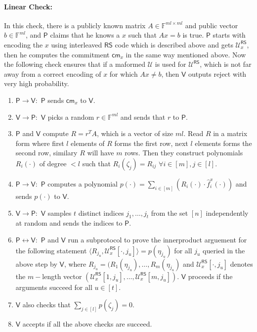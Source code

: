 \documentclass[runningheads]{llncs}
\newcommand{\innp}[2]{\langle #1,#2\rangle}
\def\prover{\mathsf{P}}
\def\verifier{\mathsf{V}}
\def\RS{\mathsf{RS}} %
\def\cm{\mathsf{cm}} %
\def\calU{\mathcal{U}}
\def\bbF{\mathbb{F}}
\begin{document}
	\paragraph{\textbf{Linear Check:}} In this check, there is a publicly known matrix $A \in \bbF^{ml\times ml}$ and public vector $b\in \bbF^{ml}$, and $\prover$ claims that he knows a $x$ such that $Ax=b$ is true. $\prover$ starts with encoding the $x$ using interleaved $\RS$ code which is described above and gets $\calU^{\RS}_x$, then he computes the commitment $\cm_x$ in the same way mentioned above. Now the following check ensures that if a maformed $\calU$ is used for $\calU^{\RS}$, which is not far away from a correct encoding of $x$ for which $Ax\neq b$, then $\verifier$ outputs reject with very high probability.
	\begin{enumerate}
		\item $\prover \rightarrow \verifier: $ $\prover$ sends $\cm_x$ to $\verifier$.
		\item $\verifier \rightarrow \prover: $ $\verifier$ picks a random $r\in \bbF^{ml}$ and sends that $r$ to $\prover$.
		\item $\prover$ and $\verifier$ compute $R=r^TA$, which is a vector of size $ml$. Read $R$ in a matrix form where first $l$ elements of $R$ forms the first row, next $l$ elements forms the second row, similary $R$ will have $m$ rows. Then they construct polynomials $R_i(\cdot)$ of degree $<l$ such that $R_i(\zeta_j)=R_{ij}$ $\forall i\in [m], j\in [l]$. 
		\item $\prover \rightarrow \verifier: $  $\prover$ computes a polynomial $p(\cdot)=\sum_{i\in[m]} ( R_i(\cdot)\cdot \hat{f}^x_i(\cdot))$ and sends $p(\cdot)$ to $\verifier$.
		\item $\verifier \rightarrow \prover: $ $\verifier$ samples $t$ distinct  indices $j_1,\ldots,j_t$ from the set $[n]$ independently at random and sends the indices to $\prover$.
		\item $\prover \leftrightarrow \verifier: $ $\prover$ and $\verifier$ run a subprotocol to prove the innerproduct arguement for the following statement $\innp{R_{j_u}}{\calU^{\RS}_x[\cdot,j_u]} = p(\eta_{j_u})$ for all $j_u$ queried in the above step by $\verifier$, where $R_{j_u}=(R_1(\eta_{j_u}),\ldots,R_m(\eta_{j_u})$ and $\calU^{\RS}_x[\cdot,j_u]$ denotes the $m-$length vector $(\calU^{\RS}_x[1,j_u],\ldots, \calU^{\RS}_x[m,j_u])$. $\verifier$ proceeds if the arguments succeed for all $u \in [t]$.
		\item $\verifier$ also checks that $\sum_{j\in[l]} p(\zeta_j)=0$.
		\item $\verifier$ accepts if all the above checks are succeed.	  
	\end{enumerate}
	
\end{document}
